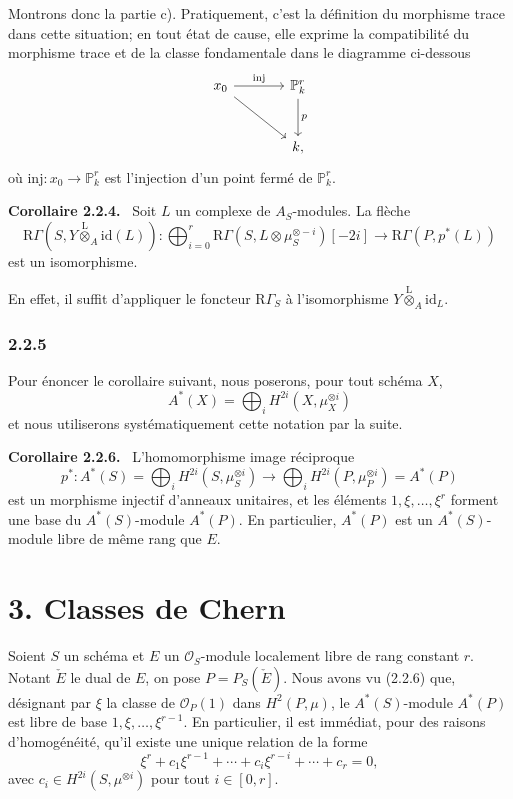 \documentclass[11pt]{article}
\newenvironment{statement}[1]{\par\medskip\noindent\textbf{#1.}\ }{\par\medskip}
\providecommand{\lten}{\overset{\mathrm L}{\otimes}}
\providecommand{\lten}{\overset{\mathrm L}{\otimes}}
\providecommand{\lten}{\overset{\mathrm L}{\otimes}}
\providecommand{\lten}{\overset{\mathrm L}{\otimes}}
\providecommand{\lten}{\overset{\mathrm L}{\otimes}}
\providecommand{\lten}{\overset{\mathrm L}{\otimes}}
\providecommand{\lten}{\overset{\mathrm L}{\otimes}}
\begin{document}
Montrons donc la partie c). Pratiquement, c'est la définition du morphisme trace dans cette situation; en tout état de cause, elle exprime la compatibilité du morphisme trace et de la classe fondamentale dans le diagramme ci-dessous
\[
\begin{tikzcd}[column sep=large,row sep=large]
x_0 \arrow[r,"\mathrm{inj}"] \arrow[dr] & \mathbb P^r_k \arrow[d,"p"]\\
& k ,
\end{tikzcd}
\]
où $\mathrm{inj}:x_0\to \mathbb P^r_k$ est l'injection d'un point fermé de $\mathbb P^r_k$.

\begin{statement}{Corollaire 2.2.4}
Soit $L$ un complexe de $A_S$-modules. La flèche
\[
\mathrm R\Gamma(S,Y\lten_A\mathrm{id}(L)):
\bigoplus_{i=0}^r \mathrm R\Gamma(S,L\otimes\mu_S^{\otimes -i})[-2i]
\longrightarrow
\mathrm R\Gamma(P,p^*(L))
\]
est un isomorphisme.
\end{statement}

En effet, il suffit d'appliquer le foncteur $\mathrm R\Gamma_S$ à l'isomorphisme $Y\lten_A\mathrm{id}_L$.

\subsubsection*{2.2.5}
Pour énoncer le corollaire suivant, nous poserons, pour tout schéma $X$,
\[
A^*(X)=\bigoplus_i H^{2i}(X,\mu_X^{\otimes i})
\]
et nous utiliserons systématiquement cette notation par la suite.

\begin{statement}{Corollaire 2.2.6}
L'homomorphisme image réciproque
\[
p^*:A^*(S)=\bigoplus_i H^{2i}(S,\mu_S^{\otimes i})
\longrightarrow
\bigoplus_i H^{2i}(P,\mu_P^{\otimes i})=A^*(P)
\]
est un morphisme injectif d'anneaux unitaires, et les éléments $1,\xi,\ldots,\xi^r$ forment une base du $A^*(S)$-module $A^*(P)$. En particulier, $A^*(P)$ est un $A^*(S)$-module libre de même rang que $E$.
\end{statement}

\section*{3. Classes de Chern}

Soient $S$ un schéma et $E$ un $\mathcal O_S$-module localement libre de rang constant $r$. Notant $\check E$ le dual de $E$, on pose $P=P_S(\check E)$. Nous avons vu (2.2.6) que, désignant par $\xi$ la classe de $\mathcal O_P(1)$ dans $H^2(P,\mu)$, le $A^*(S)$-module $A^*(P)$ est libre de base $1,\xi,\ldots,\xi^{r-1}$. En particulier, il est immédiat, pour des raisons d'homogénéité, qu'il existe une unique relation de la forme
\[
\xi^r+c_1\xi^{r-1}+\cdots+c_i\xi^{r-i}+\cdots+c_r=0,
\tag{3.1}
\]
avec $c_i\in H^{2i}(S,\mu^{\otimes i})$ pour tout $i\in[0,r]$.
\end{document}
